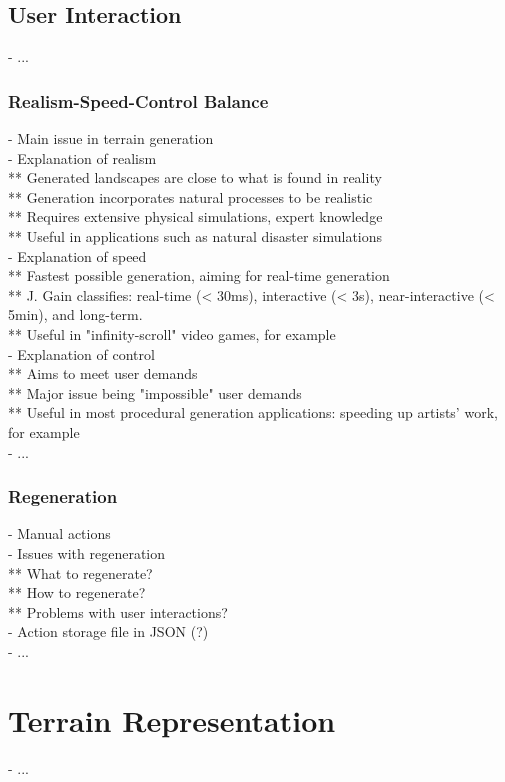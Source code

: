 \subsection{User Interaction}
- ...

\subsubsection{Realism-Speed-Control Balance}
- Main issue in terrain generation \\
- Explanation of realism \\
** Generated landscapes are close to what is found in reality \\
** Generation incorporates natural processes to be realistic \\
** Requires extensive physical simulations, expert knowledge \\
** Useful in applications such as natural disaster simulations \\
- Explanation of speed \\
** Fastest possible generation, aiming for real-time generation \\
** J. Gain classifies: real-time (< 30ms), interactive (< 3s), near-interactive (< 5min), and long-term. \\
** Useful in "infinity-scroll" video games, for example \\
- Explanation of control \\
** Aims to meet user demands \\
** Major issue being "impossible" user demands \\
** Useful in most procedural generation applications: speeding up artists' work, for example \\
- ...

\subsubsection{Regeneration}
- Manual actions \\
- Issues with regeneration \\
** What to regenerate? \\
** How to regenerate? \\
** Problems with user interactions? \\
- Action storage file in JSON (?) \\
- ...

\section{Terrain Representation}
\label{sec:introduction_terrain-representations}
- ...

